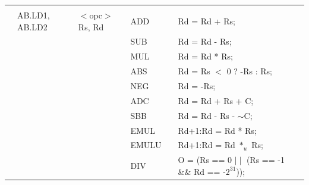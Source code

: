 \begin{table}
\begin{center}
\begin{tabular}{llllll}
                   &                   &                                       &                   &                   &                                                                               \\
                   & AB.LD1, AB.LD2    & $<$opc$>$ Rs, Rd                      & ADD               & \flags{****}      & Rd = Rd + Rs;                                                                 \\
                   &                   &                                       & SUB               & \flags{****}      & Rd = Rd - Rs;                                                                 \\
                   &                   &                                       & MUL               & \flags{----}      & Rd = Rd * Rs;                                                                 \\
                   &                   &                                       & ABS               & \flags{***-}      & Rd = Rs $<$ 0 ? -Rs : Rs;                                                     \\
                   &                   &                                       & NEG               & \flags{****}      & Rd = -Rs;                                                                     \\
                   &                   &                                       & ADC               & \flags{****}      & Rd = Rd + Rs + C;                                                             \\
                   &                   &                                       & SBB               & \flags{****}      & Rd = Rd - Rs - $\sim$C;                                                       \\
                   &                   &                                       & EMUL              & \flags{----}      & Rd+1:Rd = Rd * Rs;                                                            \\
                   &                   &                                       & EMULU             & \flags{----}      & Rd+1:Rd = Rd $*_u$ Rs;                                                        \\
                   &                   &                                       & DIV               & \flags{!---}      & O = (Rs == 0 $\mid\mid$ (Rs == -1 \&\& Rd == -$2^{31}$));                     \\

\end{tabular}
\end{center}
\end{table}
